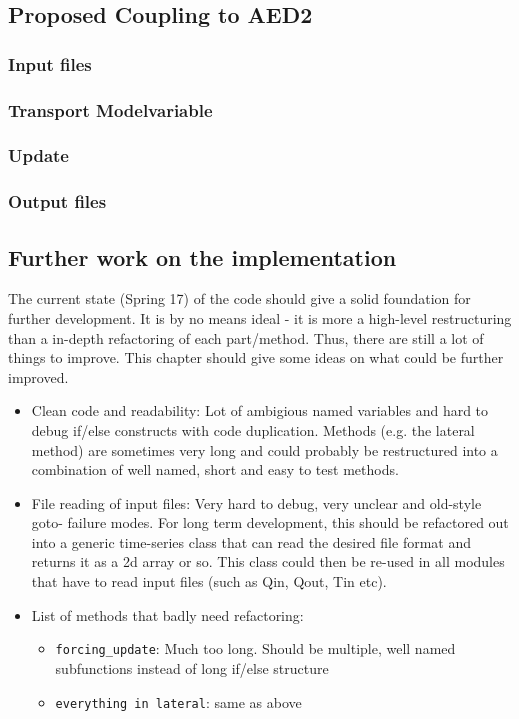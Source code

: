 \documentclass[paper=a4, fontsize=12pt]{article}
\begin{document}
\subsection{Proposed Coupling to AED2}

\subsubsection{Input files}

\subsubsection{Transport Modelvariable}

\subsubsection{Update}

\subsubsection{Output files}

\subsection{Further work on the implementation}
The current state (Spring 17) of the code should give a solid foundation for further development. It is by no means ideal - it is more a high-level restructuring than a in-depth refactoring of each part/method. Thus, there are still a lot of things to improve. This chapter should give some ideas on what could be further improved.

\begin{itemize}
	\item Clean code and readability: Lot of ambigious named variables and hard to debug if/else constructs with code duplication. Methods (e.g. the lateral method) are sometimes very long and could probably be restructured into a combination of well named, short and easy to test methods. 
	
	\item File reading of input files: Very hard to debug, very unclear and old-style goto- failure modes. For long term development, this should be refactored out into a generic time-series class that can read the desired file format and returns it as a 2d array or so. This class could then be re-used in all modules that have to read input files (such as Qin, Qout, Tin etc).
	
	\item List of methods that badly need refactoring:
	\begin{itemize}
		\item \texttt{forcing\_update}: Much too long. Should be multiple, well named subfunctions instead of long if/else structure
		
			\item \texttt{everything in lateral}: same as above
	\end{itemize}

\end{itemize}
\end{document}
